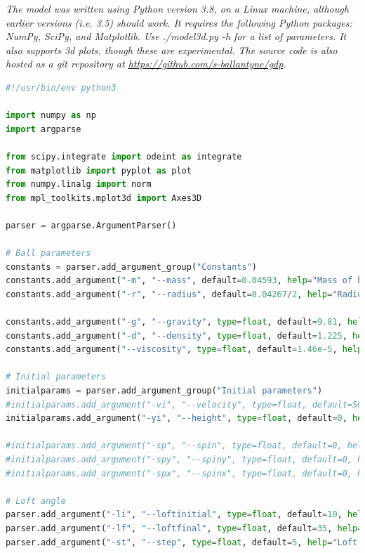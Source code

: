 \documentclass[12pt]{article}
\begin{document}
{}


\pagebreak


\textit{The model was written using Python version 3.8, on a Linux machine, although earlier versions (i.e. 3.5) should work. It requires the following Python packages: NumPy, SciPy, and Matplotlib. Use ./model3d.py -h for a list of parameters. It also supports 3d plots, though these are experimental. The source code is also hosted as a git repository at \url{https://github.com/s-ballantyne/gdp}.}
\begin{lstlisting}[language=Python, caption=Python model), style=PythonStyle, basicstyle=\tiny]
#!/usr/bin/env python3

import numpy as np
import argparse

from scipy.integrate import odeint as integrate
from matplotlib import pyplot as plot
from numpy.linalg import norm
from mpl_toolkits.mplot3d import Axes3D

parser = argparse.ArgumentParser()

# Ball parameters
constants = parser.add_argument_group("Constants")
constants.add_argument("-m", "--mass", default=0.04593, help="Mass of ball (kg)")
constants.add_argument("-r", "--radius", default=0.04267/2, help="Radius of ball (m)")

constants.add_argument("-g", "--gravity", type=float, default=9.81, help="For when we get a Mars base (m/s/s)")
constants.add_argument("-d", "--density", type=float, default=1.225, help="Density of air (kg m^-3)")
constants.add_argument("--viscosity", type=float, default=1.46e-5, help="Kinematic viscosity of air")

# Initial parameters
initialparams = parser.add_argument_group("Initial parameters")
#initialparams.add_argument("-vi", "--velocity", type=float, default=50, help="Initial velocity (m/s)")
initialparams.add_argument("-yi", "--height", type=float, default=0, help="Initial height (m)")

#initialparams.add_argument("-sp", "--spin", type=float, default=0, help="Spin (z)")
#initialparams.add_argument("-spy", "--spiny", type=float, default=0, help="Spin (y)")
#initialparams.add_argument("-spx", "--spinx", type=float, default=0, help="Spin (x)")

# Loft angle
parser.add_argument("-li", "--loftinitial", type=float, default=10, help="Loft angle (initial)")
parser.add_argument("-lf", "--loftfinal", type=float, default=35, help="Loft angle (final)")
parser.add_argument("-st", "--step", type=float, default=5, help="Loft angle (step)")


\end{lstlisting}
\end{document}
